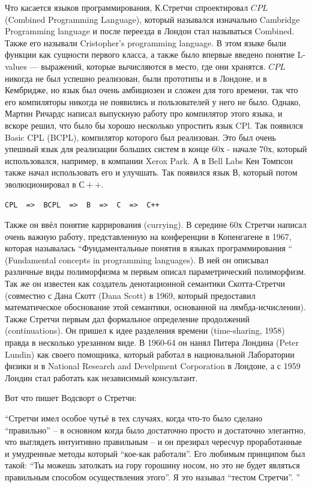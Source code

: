 \documentclass[14pt]{matmex-diploma-custom}
\begin{document}
Что касается языков программирования, К.Стретчи спроектировал $CPL$ (Combined Programming Language), который назывался изначально Cambridge Programming language и после переезда в Лондон стал называться Combined. Также его называли Cristopher’s programming language. В этом языке были функции как сущности первого класса, а также было впервые введено понятие L-values --- выражений, которые вычисляются в место, где они хранятся. $CPL$ никогда не был успешно реализован, были прототипы и в Лондоне, и в Кембридже, но язык был очень амбициозен и сложен для того времени, так что его компиляторы никогда не появились и пользователей у него не было. Однако, Мартин Ричардс написал выпускную работу про компилятор этого языка, и вскоре решил, что было бы хорошо несколько упростить язык CPl. Так появился Basic CPL (BCPL), компилятор которого был реализован. Это был очень упешный язык для реализации больших систем в конце 60х - начале 70х, который использовался, например, в компании Xerox Park. А в Bell Labs Кен Томпсон также начал использовать его и улучшать. Так появился язык $В$, который потом эволюционировал в $С++$.

\begin{verbatim}
CPL  =>  BCPL  =>  B  =>  C  =>  C++
\end{verbatim}

Также он ввёл понятие каррирования (currying). В середине 60х Стретчи написал очень важную работу, представленную на конференции в Копенгагене в 1967, которая называлась  “Фундаментальные понятия в языках программирования “ (Fundamental concepts in programming languages). В ней он описывал различные виды полиморфизма м первым описал параметрический полиморфизм. Так же он известен как создатель денотационной семантики Скотта-Стретчи (совместно с Дана Скотт (Dana Scott) в 1969, который предоставил математическое обоснование этой семантики, основанной на лямбда-исчислении). Также Стретчи первым дал формальное определение продолжений (continuations). Он пришел к идее разделения времени (time-sharing, 1958) правда в несколько урезанном виде. В 1960-64 он нанял Питера Лондина (Peter Lundin) как своего помощника, который работал в национальной Лаборатории физики и в National Research and Develpment Corporation в Лондоне, а с 1959 Лондин стал работать как независимый консультант. 

\begin{framed}
Вот что пишет Водсворт о Стретчи:

“Стретчи имел особое чутьё в тех случаях, когда что-то было сделано “правильно” -- в основном когда было достаточно просто и достаточно элегантно, что выглядеть интуитивно правильным -- и он презирал чересчур проработанные и умудренные методы который “кое-как работали”. Его любимым принципом был такой: “Ты можешь затолкать на гору горошину носом, но это не будет являться правильным способом осуществления этого”. Я это называл “тестом Стретчи”.
”
\end{framed}
\end{document}
